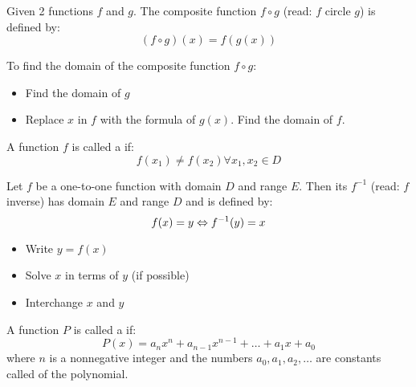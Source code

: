            \par Given 2 functions $f$ and $g$. The composite function $f \circ g$ (read: $f$
            circle $g$) is defined by:
            \begin{equation}
                (f \circ g)(x) = f(g(x))
            \end{equation}
            \par To find the domain of the composite function $f \circ g$:
            \begin{itemize}
                \item Find the domain of $g$
                \item Replace $x$ in $f$ with the formula of $g(x)$. Find the domain of $f$.
            \end{itemize}
    \hiiEND

        \par A function $f$ is called a  if:
        \begin{equation}
            f(x_{1}) \neq f(x_{2}) \forall x_{1}, x_{2} \in D
        \end{equation}

            \par Let $f$ be a one-to-one function with domain $D$ and range $E$. Then its
             $f^{-1}$ (read: $f$ inverse) has domain $E$ and range $D$ and
            is defined by:
            \begin{equation}
                f(x) = y \Leftrightarrow f^{-1}(y) = x
            \end{equation}
            \begin{itemize}
                \item Write $y = f(x)$
                \item Solve $x$ in terms of $y$ (if possible)
                \item Interchange $x$ and $y$
            \end{itemize}
    \hiiEND
        
        \par A function $P$ is called a  if:
        \begin{equation}
            P(x) = a_{n}x^{n} + a_{n-1}x^{n-1} + \ldots + a_{1}x + a_{0}
        \end{equation}
        where $n$ is a nonnegative integer and the numbers $a_{0}, a_{1}, a_{2}, \ldots$ are 
        constants called  of the polynomial.

